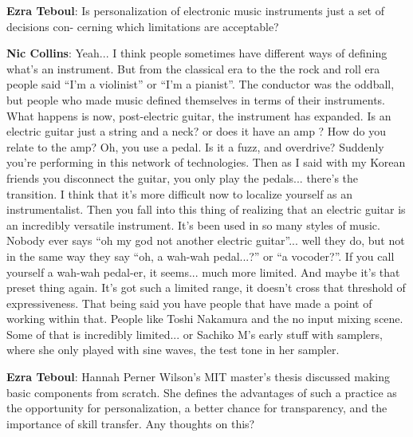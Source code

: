 \textbf{Ezra Teboul}: Is personalization of electronic music instruments just a set of decisions con- cerning which limitations are acceptable?
					
\textbf{Nic Collins}: Yeah... I think people sometimes have different ways of defining what’s an instrument. But from the classical era to the the rock and roll era people said ``I’m a violinist'' or ``I’m a pianist''. The conductor was the oddball, but people who made music defined themselves in terms of their instruments. What happens is now, post-electric guitar, the instrument has expanded. Is an electric guitar just a string and a neck? or does it have an amp ? How do you relate to the amp? Oh, you use a pedal. Is it a fuzz, and overdrive? Suddenly you’re performing in this network of technologies. Then as I said with my Korean friends you disconnect the guitar, you only play the pedals... there’s the transition. I think that it’s more difficult now to localize yourself as an instrumentalist. Then you fall into this thing of realizing that an electric guitar is an incredibly versatile instrument. It’s been used in so many styles of music. Nobody ever says ``oh my god not another electric guitar''... well they do, but not in the same way they say ``oh, a wah-wah pedal...?'' or ``a vocoder?''. If you call yourself a wah-wah pedal-er, it seems... much more limited. And maybe it’s that preset thing again. It’s got such a limited range, it doesn’t cross that threshold of expressiveness. That being said you have people that have made a point of working within that. People like Toshi Nakamura and the no input mixing scene. Some of that is incredibly limited... or Sachiko M’s early stuff with samplers, where she only played with sine waves, the test tone in her sampler.
					
\textbf{Ezra Teboul}: Hannah Perner Wilson’s MIT master’s thesis discussed making basic components from scratch. She defines the advantages of such a practice as the opportunity for personalization, a better chance for transparency, and the importance of skill transfer. Any thoughts on this?
					
